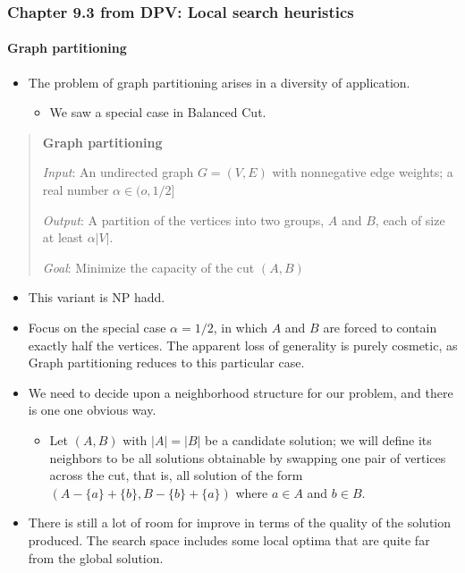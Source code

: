 \documentclass[a4paper,11pt]{article}
\begin{document}
\subsubsection{Chapter 9.3 from DPV: Local search
heuristics}\label{chapter-9.3-from-dpv-local-search-heuristics}

\paragraph{Graph partitioning}\label{graph-partitioning}

\begin{itemize}
\itemsep1pt\parskip0pt
\item
  The problem of graph partitioning arises in a diversity of
  application.

  \begin{itemize}
  \itemsep1pt\parskip0pt
  \item
    We saw a special case in Balanced Cut.
  \end{itemize}
\end{itemize}

\begin{quote}
\textbf{Graph partitioning}

\emph{Input}: An undirected graph $G = (V, E)$ with nonnegative edge
weights; a real number $\alpha \in (o, 1/2]$

\emph{Output}: A partition of the vertices into two groups, $A$ and $B$,
each of size at least $\alpha |V|$.

\emph{Goal}: Minimize the capacity of the cut $(A, B)$
\end{quote}

\begin{itemize}
\itemsep1pt\parskip0pt
\item
  This variant is NP hadd.
\item
  Focus on the special case $\alpha = 1/2$, in which $A$ and $B$ are
  forced to contain exactly half the vertices. The apparent loss of
  generality is purely cosmetic, as Graph partitioning reduces to this
  particular case.
\item
  We need to decide upon a neighborhood structure for our problem, and
  there is one one obvious way.

  \begin{itemize}
  \itemsep1pt\parskip0pt
  \item
    Let $(A, B)$ with $|A| = |B|$ be a candidate solution; we will
    define its neighbors to be all solutions obtainable by swapping one
    pair of vertices across the cut, that is, all solution of the form
    $(A - \{a\} + \{b\}, B - \{b\} + \{a\})$ where $a \in A$ and
    $b \in B$.
  \end{itemize}
\item
  There is still a lot of room for improve in terms of the quality of
  the solution produced. The search space includes some local optima
  that are quite far from the global solution.
\end{itemize}
\end{document}
